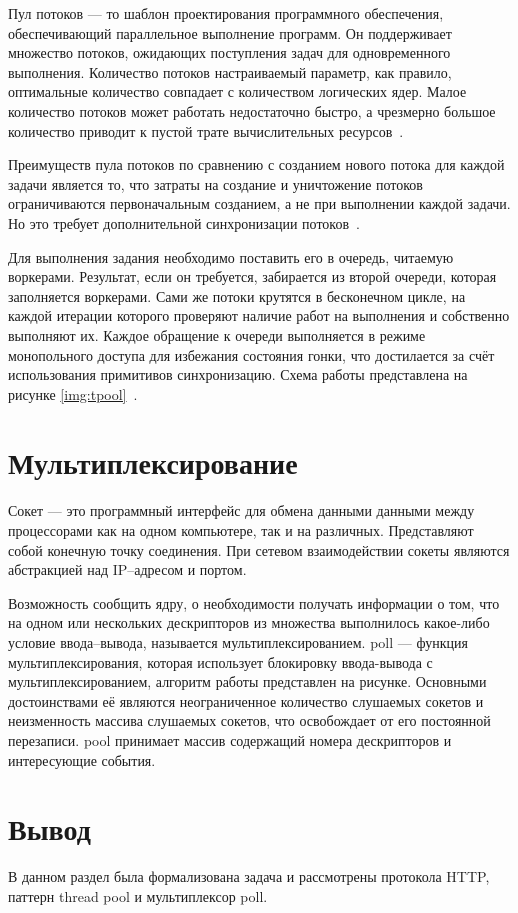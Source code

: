 Пул потоков --- то шаблон проектирования программного обеспечения, обеспечивающий параллельное выполнение программ. Он поддерживает множество потоков, ожидающих поступления задач для одновременного выполнения. Количество потоков настраиваемый параметр, как правило, оптимальные количество совпадает с количеством логических ядер. Малое количество потоков может работать недостаточно быстро, а чрезмерно большое количество приводит к пустой трате вычислительных ресурсов~\cite{tpool}.

Преимуществ пула потоков по сравнению с созданием нового потока для каждой задачи является то, что затраты на создание и уничтожение потоков ограничиваются первоначальным созданием, а не при выполнении каждой задачи. Но это требует дополнительной синхронизации потоков~\cite{tpool}.

Для выполнения задания необходимо поставить его в очередь, читаемую воркерами. Результат, если он требуется, забирается из второй очереди, которая заполняется воркерами. Сами же потоки крутятся в бесконечном цикле, на каждой итерации которого проверяют наличие работ на выполнения и собственно выполняют их. Каждое обращение к очереди выполняется в режиме монопольного доступа для избежания состояния гонки, что достилается за счёт использования примитивов синхронизацию. Схема работы представлена на рисунке \ref{img:tpool}~\cite{tpool}.

\FloatBarrier

\section{Мультиплексирование}

Сокет --- это программный интерфейс для обмена данными данными между процессорами как на одном компьютере, так и на различных. Представляют собой конечную точку соединения. При сетевом взаимодействии сокеты являются абстракцией над IP--адресом и портом.

Возможность сообщить ядру, о необходимости получать информации о том, что на одном или нескольких дескрипторов из множества выполнилось какое-либо условие ввода--вывода, называется мультиплексированием. poll --- функция мультиплексирования, которая использует блокировку ввода-вывода с мультиплексированием, алгоритм работы представлен на рисунке. Основными достоинствами её являются неограниченное количество слушаемых сокетов и неизменность массива слушаемых сокетов, что освобождает от его постоянной перезаписи. pool принимает массив содержащий номера дескрипторов и интересующие события.  

\FloatBarrier

\section*{Вывод}

В данном раздел была формализована задача и рассмотрены протокола HTTP, паттерн thread pool и мультиплексор poll.

